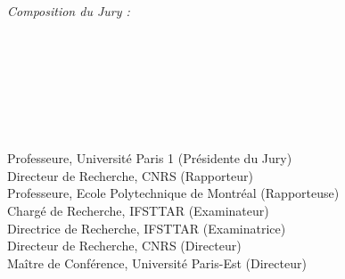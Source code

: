 \begin{titlepage}
\begin{addmargin}[-1cm]{-3cm}
\begin{center}
\textit{Composition du Jury :}

\medskip


\begin{adjustwidth*}{-0.5cm}{-2cm}
\begin{minipage}{0.28\linewidth}
\raggedright
\textbf{}\\
\textbf{}\\
\textbf{}\\
\textbf{}\\
\textbf{}\\
\textbf{}\\
\textbf{}
\end{minipage}
\begin{minipage}{0.7\linewidth}
\raggedright
Professeure, Université Paris 1 (Présidente du Jury)\\
Directeur de Recherche, CNRS (Rapporteur)\\
Professeure, Ecole Polytechnique de Montréal (Rapporteuse)\\
Chargé de Recherche, IFSTTAR (Examinateur)\\
Directrice de Recherche, IFSTTAR (Examinatrice)\\
Directeur de Recherche, CNRS (Directeur)\\
Maître de Conférence, Université Paris-Est (Directeur)\\
\end{minipage}
\end{adjustwidth*}

\vfill

\end{center}
\end{addmargin}

\end{titlepage}




